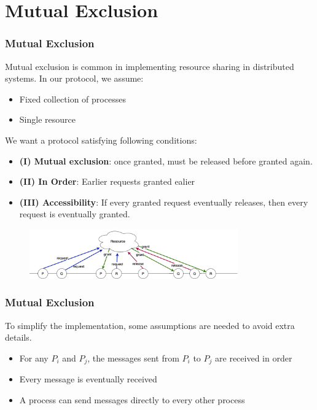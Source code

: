 \documentclass{beamer}
\begin{document}
\section{Mutual Exclusion}
\frame
{
  \frametitle{Mutual Exclusion}
  Mutual exclusion is common in implementing resource sharing in distributed systems.
  In our protocol, we assume:
  \begin{itemize}
  	\item<2-> Fixed collection of processes
  	\item<3-> Single resource
  \end{itemize}
   We want a protocol satisfying following conditions:
  \begin{itemize}
  	\item<5-> \textbf{(I) Mutual exclusion}: once granted, must be released before granted again.
  	\item<6-> \textbf{(II) In Order}: Earlier requests granted ealier
  	\item<7-> \textbf{(III) Accessibility}: If every granted request eventually releases, then every request is eventually granted.
  \end{itemize}

  \begin{figure}[ht!]
  \includegraphics[width=0.8\textwidth]{files/ClockDist-Mutual-Exclusion.png}
  \end{figure}

}

\frame
{
  \frametitle{Mutual Exclusion}

  To simplify the implementation, some assumptions are needed to avoid extra details.
  \begin{itemize}
  	\item<2-> For any $P_i$ and $P_j$, the messages sent from $P_i$ to $P_j$ are received in order
  	\item<3-> Every message is eventually received
  	\item<4-> A process can send messages directly to every other process
  \end{itemize}


%
}
\end{document}
